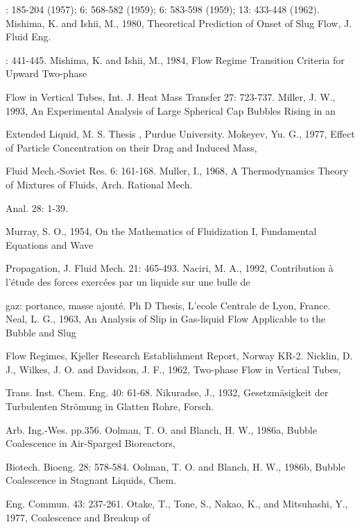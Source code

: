 \documentclass[11pt,a4paper,openany,fontset=none]{ctexbook}
\begin{document}
{\small\raggedright{}: 185-204 (1957); 6: 568-582 (1959); 6: 583-598 (1959); 13: 433-448 (1962). Mishima, K. and Ishii, M., 1980, Theoretical Prediction of Onset of Slug Flow, J. Fluid Eng.\par}
{\small\raggedright{}: 441-445. Mishima, K. and Ishii, M., 1984, Flow Regime Transition Criteria for Upward Two-phase\par}
{\small\raggedright\noindent Flow in Vertical Tubes, Int. J. Heat Mass Transfer 27: 723-737. Miller, J. W., 1993, An Experimental Analysis of Large Spherical Cap Bubbles Rising in an\par}
{\small\raggedright\noindent Extended Liquid, M. S. Thesis , Purdue University. Mokeyev, Yu. G., 1977, Effect of Particle Concentration on their Drag and Induced Mass,\par}
{\small\raggedright\noindent Fluid Mech.-Soviet Res. 6: 161-168. Muller, I., 1968, A Thermodynamics Theory of Mixtures of Fluids, Arch. Rational Mech.\par}
{\small\raggedright\noindent Anal. 28: 1-39.\par}
{\small\raggedright\noindent Murray, S. O., 1954, On the Mathematics of Fluidization I, Fundamental Equations and Wave\par}
{\small\raggedright\noindent Propagation, J. Fluid Mech. 21: 465-493. Naciri, M. A., 1992, Contribution à l’étude des forces exercées par un liquide sur une bulle de\par}
{\small\raggedright\noindent gaz: portance, masse ajouté. Ph D Thesis, L’ecole Centrale de Lyon, France. Neal, L. G., 1963, An Analysis of Slip in Gas-liquid Flow Applicable to the Bubble and Slug\par}
{\small\raggedright\noindent Flow Regimes, Kjeller Research Establishment Report, Norway KR-2. Nicklin, D. J., Wilkes, J. O. and Davidson, J. F., 1962, Two-phase Flow in Vertical Tubes,\par}
{\small\raggedright\noindent Trans. Inst. Chem. Eng. 40: 61-68. Nikuradse, J., 1932, Gesetzmäsigkeit der Turbulenten Strömung in Glatten Rohre, Forsch.\par}
{\small\raggedright\noindent Arb. Ing.-Wes. pp.356. Oolman, T. O. and Blanch, H. W., 1986a, Bubble Coalescence in Air-Sparged Bioreactors,\par}
{\small\raggedright\noindent Biotech. Bioeng. 28: 578-584. Oolman, T. O. and Blanch, H. W., 1986b, Bubble Coalescence in Stagnant Liquids, Chem.\par}
{\small\raggedright\noindent Eng. Commun. 43: 237-261. Otake, T., Tone, S., Nakao, K., and Mitsuhashi, Y., 1977, Coalescence and Breakup of\par}
\end{document}
